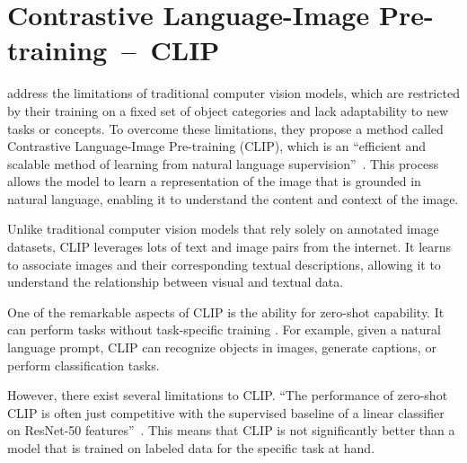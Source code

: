 \section{Contrastive Language-Image Pre-training~--~CLIP}\label{CLIP}

\citeauthor{radfordCLIP} address the limitations of traditional computer vision models, which are restricted by their training on a fixed set of object categories and lack adaptability to new tasks or concepts. To overcome these limitations, they propose a method called Contrastive Language-Image Pre-training (CLIP), which is an ``efficient and scalable method of learning from natural language supervision''~\citep{radfordCLIP}. This process allows the model to learn a representation of the image that is grounded in natural language, enabling it to understand the content and context of the image.

Unlike traditional computer vision models that rely solely on annotated image datasets, CLIP leverages lots of text and image pairs from the internet. It learns to associate images and their corresponding textual descriptions, allowing it to understand the relationship between visual and textual data.

One of the remarkable aspects of CLIP is the ability for zero-shot capability. It can perform tasks without task-specific training \citep{radfordCLIP}. For example, given a natural language prompt, CLIP can recognize objects in images, generate captions, or perform classification tasks.

However, there exist several limitations to CLIP\@. ``The performance of zero-shot CLIP is often just competitive with the supervised baseline of a linear classifier on ResNet-50 features''~\citep{radfordCLIP}.  This means that CLIP is not significantly better than a model that is trained on labeled data for the specific task at hand.
